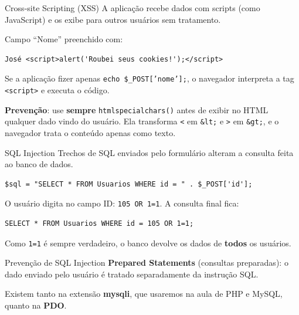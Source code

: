 \documentclass{beamer}
\begin{document}
\begin{frame}[fragile]{Cross-site Scripting (XSS)}
	A aplicação recebe dados com scripts (como JavaScript) e os exibe para
	outros usuários sem tratamento.

	\vspace{0.2cm}
	Campo ``Nome'' preenchido com:

	\begin{verbatim}
José <script>alert('Roubei seus cookies!');</script>
	\end{verbatim}

	Se a aplicação fizer apenas \texttt{echo \$\_POST['nome'];}, o navegador
	interpreta a tag \texttt{<script>} e executa o código.

	\vspace{0.2cm}
	\textbf{Prevenção}: use \textbf{sempre} \texttt{htmlspecialchars()} antes de
	exibir no HTML qualquer dado vindo do usuário. Ela transforma \texttt{<} em
	\texttt{\&lt;} e \texttt{>} em \texttt{\&gt;}, e o navegador trata o
	conteúdo apenas como texto.
\end{frame}

\begin{frame}[fragile]{SQL Injection}
	Trechos de SQL enviados pelo formulário alteram a consulta feita ao banco
	de dados.

	\begin{verbatim}
$sql = "SELECT * FROM Usuarios WHERE id = " . $_POST['id'];
	\end{verbatim}

	O usuário digita no campo ID: \texttt{105 OR 1=1}. A consulta final fica:

	\begin{verbatim}
SELECT * FROM Usuarios WHERE id = 105 OR 1=1;
	\end{verbatim}

	Como \texttt{1=1} é sempre verdadeiro, o banco devolve os dados de
	\textbf{todos} os usuários.
\end{frame}

\begin{frame}{Prevenção de SQL Injection}
	\textbf{Prepared Statements} (consultas preparadas): o dado enviado pelo
	usuário é tratado separadamente da instrução SQL.

	\vspace{0.3cm}
	Existem tanto na extensão \textbf{mysqli}, que usaremos na aula de PHP e
	MySQL, quanto na \textbf{PDO}.
\end{frame}

\end{document}
